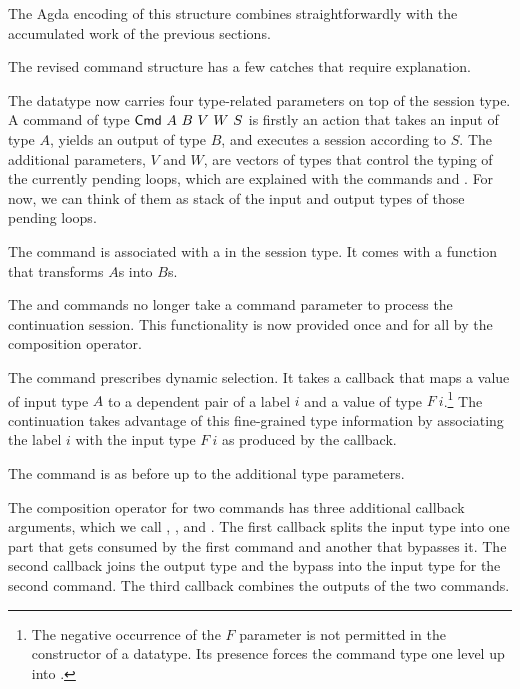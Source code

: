 \documentclass[acmsmall,screen,anonymous,review]{acmart}
\begin{document}
The Agda encoding of this structure combines straightforwardly with
the accumulated work of the previous sections.
\cstSession

The revised command structure has a few catches that require
explanation.
\cstCmd

The {\ACommand} datatype now carries four type-related parameters on
top of the session type. A command of type {$\ACommand~A~B~V~W~S$} is
firstly an action that takes an input of type $A$, yields an output of
type $B$, and executes a session according to $S$. The additional
parameters, $V$ and $W$, are vectors of types that control the typing
of the currently pending loops, which are explained with the commands
{\AMU} and {\ACONTINUE}. For now, we can think of them as stack of
the input and output types of those pending loops.

The {\ACSKIP} command is associated with a {\Atcfskip} in the session
type. It comes with a function that transforms $A$s into $B$s.

The {\ACSEND} and {\ACRECV} commands no longer take a command parameter
to process the continuation session. This functionality is now
provided once and for all by the composition operator.

The command {\ACSELECT} prescribes dynamic selection. It takes a
callback that maps a value of input type $A$ to a dependent pair of a
label $i$ and a value of type $F~i$.\footnote{The negative occurrence
  of the $F$ parameter is not permitted in the constructor of a
  {\ASet} datatype. Its presence forces the command type one level up
  into {\ASetOne}.} The continuation takes advantage of this
fine-grained type information by associating the label $i$ with the
input type $F~i$ as produced by the callback.

The {\ACCHOICE} command is as before up to the additional type parameters.

The composition operator for two commands has three additional
callback arguments, which we call {\Asplit}, {\Across}, and
{\Ajoin}. The first callback {\Asplit} splits the input type into one part that gets
consumed by the first command and another that bypasses it.
The second callback {\Across} joins the output type and the bypass into the
input type for the second command.
The third callback {\Ajoin} combines the outputs of the two commands.
\end{document}
